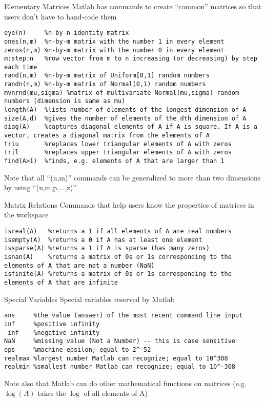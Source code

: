 \documentclass[english,xcolor=dvipsnames]{beamer}
\begin{document}
\begin{frame}[fragile]{Elementary Matrices}
\scriptsize{Matlab has commands to create ``common'' matrices so that users don't have to hand-code them}
\begin{lstlisting}
eye(n)     %n-by-n identity matrix
ones(n,m)  %n-by-m matrix with the number 1 in every element
zeros(n,m) %n-by-m matrix with the number 0 in every element
m:step:n   %row vector from m to n increasing (or decreasing) by step each time
rand(n,m)  %n-by-m matrix of Uniform[0,1] random numbers
randn(n,m) %n-by-m matrix of Normal(0,1) random numbers
mvnrnd(mu,sigma) %matrix of multivariate Normal(mu,sigma) random numbers (dimension is same as mu)
length(A)  %lists number of elements of the longest dimension of A
size(A,d)  %gives the number of elements of the dth dimension of A
diag(A)    %captures diagonal elements of A if A is square. If A is a vector, creates a diagonal matrix from the elements of A
triu       %replaces lower triangular elements of A with zeros
tril       %replaces upper triangular elements of A with zeros
find(A>1)  %finds, e.g. elements of A that are larger than 1
\end{lstlisting}
\scriptsize{Note that all ``(n,m)'' commands can be generalized to more than two dimensions by using ``(n,m,p,...,z)''}
\end{frame}

\begin{frame}[fragile]{Matrix Relations}
Commands that help users know the properties of matrices in the workspace
\begin{lstlisting}
isreal(A)   %returns a 1 if all elements of A are real numbers
isempty(A)  %returns a 0 if A has at least one element
issparse(A) %returns a 1 if A is sparse (has many zeros)
isnan(A)    %returns a matrix of 0s or 1s corresponding to the elements of A that are not a number (NaN)
isfinite(A) %returns a matrix of 0s or 1s corresponding to the elements of A that are infinite
\end{lstlisting}
\end{frame}

\begin{frame}[fragile]{Special Variables}
Special variables reserved by Matlab
\begin{lstlisting}
ans     %the value (answer) of the most recent command line input
inf     %positive infinity
-inf    %negative infinity
NaN     %missing value (Not a Number) -- this is case sensitive
eps     %machine epsilon; equal to 2^-52
realmax %largest number Matlab can recognize; equal to 10^308
realmin %smallest number Matlab can recognize; equal to 10^-308
\end{lstlisting}
Note also that Matlab can do other mathematical functions on matrices (e.g. $\log(A)$ takes the $\log$ of all elements of A)
\end{frame}
\end{document}

